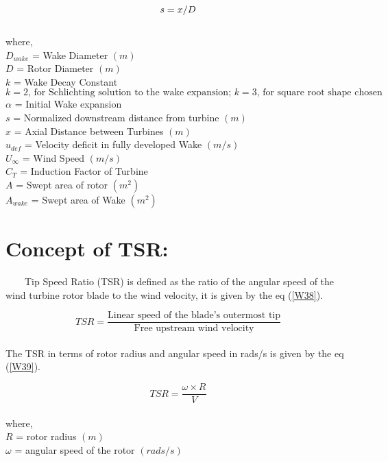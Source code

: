 \begin{equation}
\label{W51}
     s = x/D\\
\end{equation}\\
    where,\\
    $ D_{wake} $ = Wake Diameter $ (m) $ \\
    $ D $ = Rotor Diameter $ (m) $ \\
    $ k $ = Wake Decay Constant $ k=2 \text{, for Schlichting solution to the wake expansion; } k=3 \text{, for square root shape chosen } $ \\
    $ \alpha $ = Initial Wake expansion \\
    $ s $ = Normalized downstream distance from turbine $ (m) $ \\
    $ x $ = Axial Distance between Turbines $ (m) $ \\    
    $ u_{def} $ = Velocity deficit in fully developed Wake $ (m/s) $ \\
    $ U_{\infty} $ = Wind Speed $ (m/s) $ \\
    $ C_{T} $ = Induction Factor of Turbine \\
    $ A $ = Swept area of rotor $ (m^{2}) $ \\     
    $ A_{wake} $ = Swept area of Wake $ (m^{2}) $ \\
    
\newpage    
    
\section{Concept of TSR:}
\
\
\
\
Tip Speed Ratio (TSR) is defined as the ratio of the angular speed of the wind turbine rotor blade to the wind velocity, it is given by the eq (\ref{W38}).

\begin{equation}
\label{W38}
TSR = \frac{\text{Linear speed of the blade's outermost tip}}{\text{Free upstream wind velocity}}
\end{equation}\\

The TSR in terms of rotor radius and angular speed in rads/s is given by the eq (\ref{W39}).

\begin{equation}
\label{W39}
TSR = \frac{\omega \times R}{V}
\end{equation}\\
where,\\
$ R $ = rotor radius $ (m) $\\
$\omega$ = angular speed of the rotor $(rads/s)$\\

